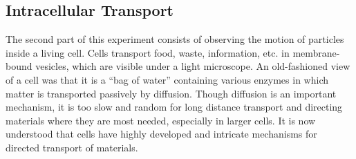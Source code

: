\documentclass{../lab}
\begin{document}
\subsection{Intracellular Transport}

The second part of this experiment consists of observing the motion of particles inside a living cell. Cells transport food, waste, information, etc. in membrane-bound vesicles, which are visible under a light microscope. An old-fashioned view of a cell was that it is a ``bag of water'' containing various enzymes in which matter is transported passively by diffusion. Though diffusion is an important mechanism, it is too slow and random for long distance transport and directing materials where they are most needed, especially in larger cells. It is now understood that cells have highly developed and intricate mechanisms for directed transport of materials.
\end{document}
